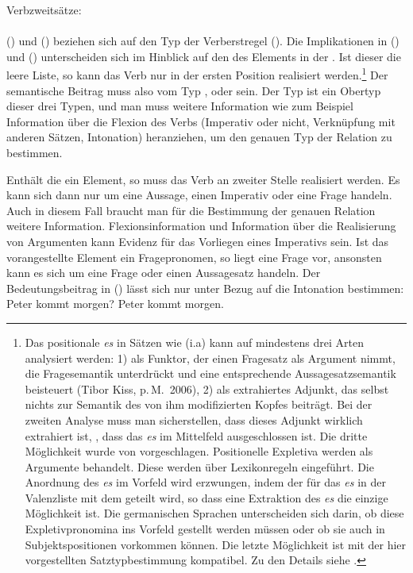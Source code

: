 \eas
\label{impl-v2}%
Verbzweitsätze:\\
 \impl\\
\hfill{}
\zs
() und () beziehen sich auf den Typ der Verberstregel ().
Die Implikationen in () und () unterscheiden sich im Hinblick auf den \slashw
des Elements in der \compsl. Ist dieser die leere Liste, so kann das Verb nur in der ersten
Position realisiert werden.\footnote{
  Das positionale \emph{es} in Sätzen wie (i.a) kann auf mindestens drei
  Arten analysiert werden: 1) als Funktor, der einen Fragesatz als Argument nimmt, die Fragesemantik
  unterdrückt und eine entsprechende Aussagesatzsemantik beisteuert (Tibor Kiss, p.\,M.\ 2006), 2) als extrahiertes Adjunkt, das selbst nichts zur Semantik des von ihm modifizierten Kopfes
  beiträgt. Bei der zweiten Analyse muss man sicherstellen, dass dieses Adjunkt wirklich extrahiert
  ist, \dash, dass das \emph{es} im Mittelfeld ausgeschlossen ist. 
\eal
{}
\zl
Die dritte Möglichkeit wurde von
  \citet{MOe2011a} vorgeschlagen. Positionelle Expletiva werden als Argumente behandelt. Diese werden
  über Lexikonregeln eingeführt. Die Anordnung des \emph{es} im Vorfeld wird erzwungen, indem der
  \slashw für das \emph{es} in der Valenzliste mit dem \localw geteilt wird, so dass eine Extraktion
  des \emph{es} die einzige Möglichkeit ist. Die germanischen Sprachen unterscheiden sich darin, ob
  diese Expletivpronomina ins Vorfeld gestellt werden müssen oder ob sie auch in Subjektspositionen
  vorkommen können. Die letzte Möglichkeit ist mit der hier vorgestellten Satztypbestimmung
  kompatibel. Zu den Details siehe .
}
Der semantische Beitrag muss also vom Typ , 
oder  sein. Der Typ  ist
ein Obertyp dieser drei Typen, und man muss weitere Information wie zum Beispiel Information über
die Flexion des Verbs (Imperativ oder nicht, Verknüpfung mit anderen Sätzen, Intonation) heranziehen,
um den genauen Typ der Relation zu bestimmen.

Enthält die \slashl ein Element, so muss das Verb an zweiter Stelle realisiert werden.
Es kann sich dann nur um eine Aussage, einen Imperativ oder eine Frage handeln. Auch in diesem
Fall braucht man für die Bestimmung der genauen Relation weitere Information. Flexionsinformation
und Information über die Realisierung von Argumenten kann Evidenz für das Vorliegen eines
Imperativs sein. Ist das vorangestellte Element ein Fragepronomen, so liegt eine Frage vor,
ansonsten kann es sich um eine Frage oder einen Aussagesatz handeln. Der Bedeutungsbeitrag in ()
lässt sich nur unter Bezug auf die Intonation bestimmen:
\eal
\ex Peter kommt morgen?
\ex Peter kommt morgen.
\zl

